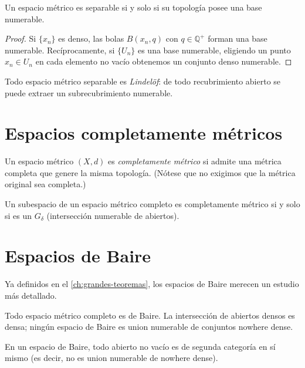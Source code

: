 \begin{theorem}
\label{teo:base-numerable}
Un espacio métrico es separable si y solo si su topología posee una base numerable.
\end{theorem}
\begin{proof}
Si $\{x_n\}$ es denso, las bolas $B(x_n,q)$ con $q\in\mathbb{Q}^+$ forman una base numerable. Recíprocamente, si $\{U_n\}$ es una base numerable, eligiendo un punto $x_n\in U_n$ en cada elemento no vacío obtenemos un conjunto denso numerable.
\end{proof}

\begin{corollary}
\label{cor:lindelof}
Todo espacio métrico separable es \emph{Lindelöf}: de todo recubrimiento abierto se puede extraer un subrecubrimiento numerable.
\end{corollary}

\section{Espacios completamente métricos}

\begin{definition}
\label{def:completamente-metrico}
Un espacio métrico $(X,d)$ es \emph{completamente métrico} si admite una métrica completa que genere la misma topología. (Nótese que no exigimos que la métrica original sea completa.)
\end{definition}

\begin{theorem}[Alexandrov]
\label{teo:alexandrov}
Un subespacio de un espacio métrico completo es completamente métrico si y solo si es un $G_\delta$ (intersección numerable de abiertos).
\end{theorem}

\section{Espacios de Baire}

Ya definidos en el \cref{ch:grandes-teoremas}, los espacios de Baire merecen un estudio más detallado.

\begin{theorem}
\label{teo:baire-recap}
Todo espacio métrico completo es de Baire. La intersección de abiertos densos es densa; ningún espacio de Baire es union numerable de conjuntos nowhere dense.
\end{theorem}

\begin{proposition}
\label{prop:abierto-denso-baire}
En un espacio de Baire, todo abierto no vacío es de segunda categoría en sí mismo (es decir, no es union numerable de nowhere dense).
\end{proposition}

